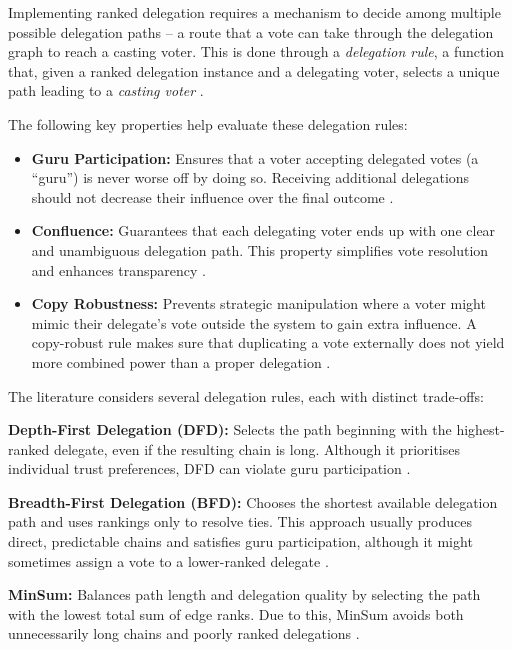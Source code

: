 Implementing ranked delegation requires a mechanism to decide among multiple possible delegation paths -- a route that a vote can take through the delegation graph to reach a casting voter.
This is done through a \textit{delegation rule}, a function that, given a ranked delegation instance and a delegating voter, selects a unique path leading to a \textit{casting voter} \citep{brill_liquid_2022}.

The following key properties help evaluate these delegation rules:

\begin{itemize}
  \item \textbf{Guru Participation:} Ensures that a voter accepting delegated votes (a ``guru'') is never worse off by doing so. Receiving additional delegations should not decrease their influence over the final outcome \citep{kotsialou_riley_2020}. 
  \item \textbf{Confluence:} Guarantees that each delegating voter ends up with one clear and unambiguous delegation path. This property simplifies vote resolution and enhances transparency \citep{brill_liquid_2022}. 
  \item \textbf{Copy Robustness:} Prevents strategic manipulation where a voter might mimic their delegate's vote outside the system to gain extra influence. A copy-robust rule makes sure that duplicating a vote externally does not yield more combined power than a proper delegation \citep{brill_liquid_2022,behrens_2015}. 
\end{itemize}

The literature considers several delegation rules, each with distinct trade-offs:

\textbf{Depth-First Delegation (DFD):} Selects the path beginning with the highest-ranked delegate, even if the resulting chain is long. Although it prioritises individual trust preferences, DFD can violate guru participation \citep{kotsialou_riley_2020}.

\textbf{Breadth-First Delegation (BFD):} Chooses the shortest available delegation path and uses rankings only to resolve ties. This approach usually produces direct, predictable chains and satisfies guru participation, although it might sometimes assign a vote to a lower-ranked delegate \citep{kotsialou_riley_2020, brill_liquid_2022}.

\textbf{MinSum:} Balances path length and delegation quality by selecting the path with the lowest total sum of edge ranks. Due to this, MinSum avoids both unnecessarily long chains and poorly ranked delegations \citep{brill_liquid_2022}.


